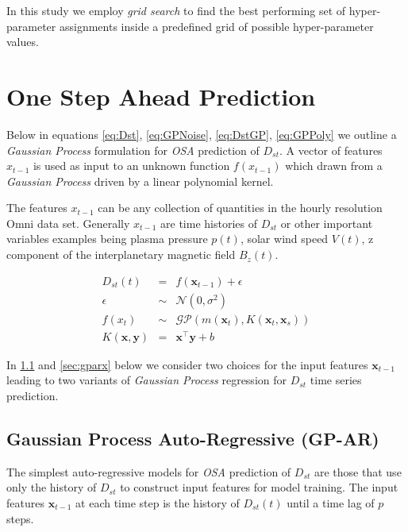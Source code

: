 \documentclass[referee,a4paper,12pt,traditabstract]{swsc}
\begin{document}
\begin{linenumbers}
In this study we employ \emph{grid search} to find the best performing set of hyper-parameter assignments inside a predefined grid of possible hyper-parameter values.


\section{One Step Ahead Prediction} \label{sec:osa}

Below in equations \ref{eq:Dst}, \ref{eq:GPNoise}, \ref{eq:DstGP}, \ref{eq:GPPoly} we outline a \emph{Gaussian Process} formulation for \emph{OSA} prediction of $D_{st}$. A vector of features $x_{t-1}$ is used as input to an unknown function $f(x_{t-1})$ which drawn from a \emph{Gaussian Process} driven by a linear polynomial kernel. 

The features $x_{t-1}$ can be any collection of quantities in the hourly resolution Omni data set. Generally $x_{t-1}$ are time histories of $D_{st}$ or other important variables examples being plasma pressure $p(t)$, solar wind speed $V(t)$, z component of the interplanetary magnetic field $B_z(t)$.

\begin{eqnarray}
    D_{st}(t) & = & f(\mathbf{x}_{t-1}) + \epsilon \label{eq:Dst} \\
    \epsilon & \sim & \mathcal{N}(0, \sigma^2) \label{eq:GPNoise} \\
    f(x_t) & \sim & \mathcal{GP}(m(\mathbf{x}_t), K(\mathbf{x}_t, \mathbf{x}_s)) \label{eq:DstGP} \\
    K(\mathbf{x}, \mathbf{y}) & = & \mathbf{x}^\intercal \mathbf{y} + b \label{eq:GPPoly}
\end{eqnarray}

In \ref{sec:gpar} and \ref{sec:gparx} below we consider two choices for the input features $\mathbf{x}_{t-1}$ leading to two variants of \emph{Gaussian Process} regression for $D_{st}$ time series prediction.

\subsection{Gaussian Process Auto-Regressive (GP-AR)} \label{sec:gpar}

The simplest auto-regressive models for \emph{OSA} prediction of $D_{st}$ are those that use only the history of $D_{st}$ to construct input features for model training. The input features $\mathbf{x}_{t-1}$ at each time step is the history of $D_{st}(t)$ until a time lag of $p$ steps.


\end{linenumbers}
\end{document}
